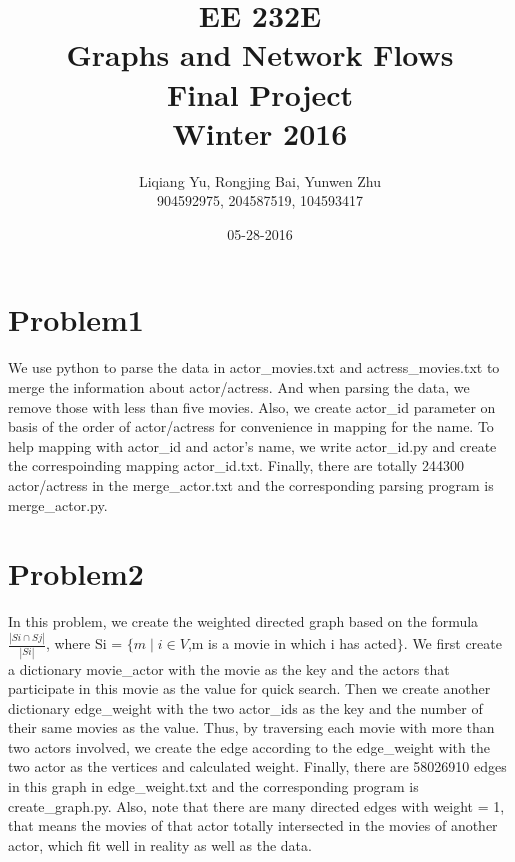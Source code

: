 \documentclass{article}
\begin{document}
\begin{titlepage}
\title{EE 232E \\Graphs and Network Flows\\Final Project\\Winter 2016} 
\author{Liqiang Yu, Rongjing Bai, Yunwen Zhu\\
904592975, 204587519, 104593417}  %
\date{05-28-2016}
\end{titlepage}

\maketitle
\newpage
\tableofcontents
\newpage

\section{Problem1}\label{prob:p1}
We use python to parse the data in actor\_movies.txt and actress\_movies.txt to merge the information about actor/actress. And when parsing the data, we remove those with less than five movies. Also, we create actor\_id parameter on basis of the order of actor/actress for convenience in mapping for the name. To help mapping with actor\_id and actor's name, we write actor\_id.py and create the correspoinding mapping actor\_id.txt. Finally, there are totally 244300 actor/actress in the merge\_actor.txt and the corresponding parsing program is merge\_actor.py. 


\section{Problem2}
In this problem, we create the weighted directed graph based on the formula $\frac{|Si\cap Sj|}{|Si|}$, where Si = $\lbrace m\mid i\in V$,m is a movie in which i has acted$\rbrace$. We first create a dictionary movie\_actor with the movie as the key and the actors that participate in this movie as the value for quick search. Then we create another dictionary edge\_weight with the two actor\_ids as the key and the number of their same movies as the value. Thus, by traversing each movie with more than two actors involved, we create the edge according to the edge\_weight with the two actor as the vertices and calculated weight. Finally, there are 58026910 edges in this graph in edge\_weight.txt and the corresponding program is create\_graph.py. Also, note that there are many directed edges with weight = 1, that means the movies of that actor totally intersected in the movies of another actor, which fit well in reality as well as the data. 
\end{document}
